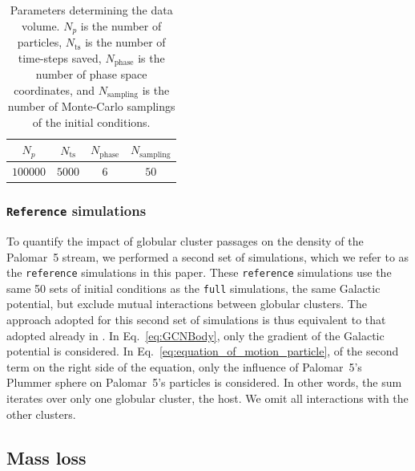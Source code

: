             \begin{center}
                \begin{table}[h]
                    \centering
                    \caption[]{Parameters determining the data volume. $N_p$  is the number of particles, $N_{\mathrm{ts}}$ is the number of time-steps saved, $N_{\mathrm{phase}}$ is the number of phase space coordinates, and $N_{\mathrm{sampling}}$ is the number of Monte-Carlo samplings of the initial conditions.}
                    \label{tab:data_volume}
                    \begin{tabular}{|c|c|c|c|}
                        \hline
                        $N_p$ & $N_{\mathrm{ts}}$ & $N_{\mathrm{phase}}$ & $N_{\mathrm{sampling}}$ \\
                        \hline
                        $100000$ & $5000$ & $6$ & $50$ \\
                        \hline
                    \end{tabular}
                \end{table}
            \end{center}

        \subsubsection{ \texttt{Reference} simulations}
        To quantify the impact of globular cluster passages on the density of the Palomar~5 stream, we performed a second set of simulations, which we refer to as the \texttt{reference} simulations in this paper.  These \texttt{reference} simulations use the same 50 sets of initial conditions as the \texttt{full} simulations, the same Galactic potential, but exclude mutual interactions between globular clusters. The approach adopted for this second set of simulations is thus equivalent to that adopted already in \citet{2023A&A...673A..44F}. In Eq.~\ref{eq:GCNBody}, only the gradient of the Galactic potential is considered. In Eq.~\ref{eq:equation_of_motion_particle}, of the second term on the right side of the equation, only the influence of Palomar~5's Plummer sphere on Palomar~5's particles is considered. In other words, the sum iterates over only one globular cluster, the host. We omit all interactions with the other clusters.
    \subsection{Mass loss}\label{sec:mass_loss}

